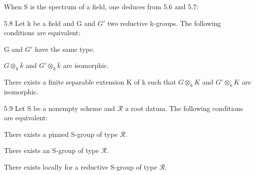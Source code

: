 When S is the spectrum of a field, one deduces from 5.6 and 5.7:
\begin{corollary}{5.8}\label{XXIII.5.8}
Let k be a field and G and $G'$ two reductive k-groups. The following conditions are equivalent:
\begin{enumeratei}
\item G and $G'$ have the same type.
\item $G\otimes_k\bar k$ and $G'\otimes_k\bar k$ are isomorphic.
\item There exists a finite separable extension K of k such that $G\otimes_k K$ and $G'\otimes_k K$ are isomorphic.
\end{enumeratei}
\end{corollary}
\begin{corollary}{5.9}\label{XXIII.5.9}
Let S be a nonempty scheme and $\mathscr R$ a root datum. The following conditions are equivalent:
\begin{enumeratei}
\item There exists a pinned S-group of type $\mathscr R$.
\item There exists an S-group of type $\mathscr R$.
\item There exists locally for \fpqc a reductive S-group of type $\mathscr R$.
\end{enumeratei}
\end{corollary}
